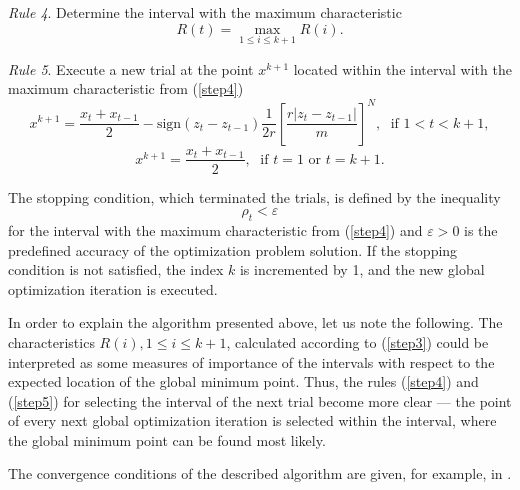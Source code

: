 \documentclass[runningheads]{llncs}
\begin{document}
\par
\textit{Rule 4}. Determine the interval with the maximum characteristic
\begin{equation} \label{step4}
R(t)=\max_{1\leq i \leq k+1}R(i).
\end{equation}
\par
\textit{Rule 5}. Execute a new trial at the point \(x^{k+1}\) located within the interval
with the maximum characteristic from (\ref{step4})
\begin{equation} \label{step5}
  x^{k+1}=\frac{x_t+x_{t-1}}{2}-\mathrm{sign}(z_{t}-z_{t-1})\frac{1}{2r}\left[\frac{r|z_{t}-z_{t-1}|}{m}\right]^N,\; \textrm{ if } 1<t<k+1,
\end{equation}
\[
  x^{k+1}=\frac{x_t+x_{t-1}}{2},\; \textrm{ if } t=1 \textrm{ or } t=k+1.
\]

\par
The stopping condition, which terminated the trials, is defined by the inequality
\begin{equation}
  \label{eq:stop_1}
\rho_t<\varepsilon
\end{equation}
for the interval with the maximum characteristic from (\ref{step4}) and \(\varepsilon >0\) is the predefined
accuracy of the optimization problem solution. If the stopping condition is not satisfied,
the index \(k\) is incremented by 1, and the new global optimization iteration is executed.
\par
In order to explain the algorithm presented above, let us note the following.
The characteristics \(R(i), 1\leq i\leq k+1\), calculated according to (\ref{step3}) could
be interpreted as some measures of importance of the intervals with respect to the
expected location of the global minimum point. Thus, the rules (\ref{step4}) and (\ref{step5}) for selecting
the interval of the next trial become more clear --- the point of every next
global optimization iteration is selected within the interval, where the global minimum
point can be found most likely.
\par
The convergence conditions of the described algorithm are given, for example, in \cite{strSergGO}.
\end{document}
